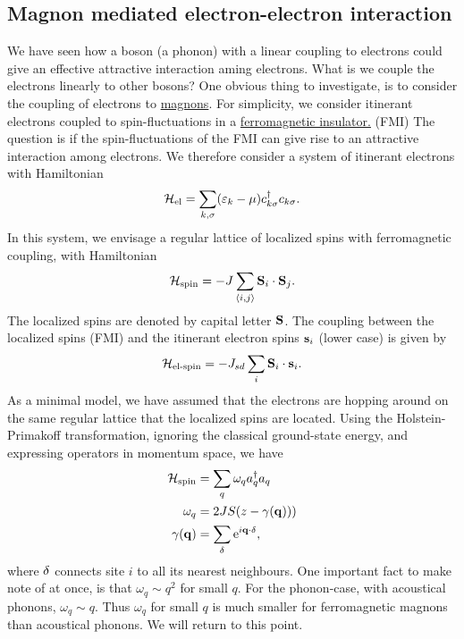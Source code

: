 \subsection[Magnons]{Magnon mediated electron-electron interaction}

We have seen how a boson (a phonon) with a linear coupling to electrons could give an effective attractive interaction aming electrons. 
What is we couple the electrons linearly to other bosons? One obvious thing to investigate, is to consider the coupling of electrons to \underline{magnons}.
For simplicity, we consider itinerant electrons coupled to spin-fluctuations in a \underline{ferromagnetic insulator.} (FMI) The question is if the spin-fluctuations of the FMI can give rise to an attractive interaction among electrons.
We therefore consider a system of itinerant electrons with Hamiltonian 
\begin{equation}
	\mathcal{H}_{\text{el}} = \sum_{k, \sigma}(\varepsilon_{k}-\mu)c_{k\sigma}^\dagger c_{k\sigma}.
\end{equation}
In this system, we envisage a regular lattice of localized spins with ferromagnetic coupling, with Hamiltonian
\begin{equation}
	\mathcal{H}_{\text{spin}} = -J\sum_{\langle i,j\rangle}\vb S_i\cdot\vb S_j.
	\end{equation}
The localized spins are denoted by capital letter $\vb S$.
The coupling between the localized spins (FMI) and the itinerant electron spins $\vb s_i$ (lower case) is given by 
\begin{equation}
	\mathcal{H}_{\text{el-spin}}  = -J_{sd}\sum_i\vb S_i\cdot \vb s_i.
\end{equation}
As a minimal model, we have assumed that the electrons are hopping around on the same regular lattice that the localized spins are located. 
Using the Holstein-Primakoff transformation, ignoring the classical ground-state energy, and expressing operators in momentum space, we have 
\begin{align}
	\mathcal{H}_{\text{spin}} &= \sum_q \omega_qa_q^\dagger a_q \\
	\omega_q &= 2JS(z- \gamma(\vb q))) \\
	\gamma(\vb q) &= \sum_\delta\mathrm{e}^{i\vb q\cdot \vb \delta},
\end{align}
where $\vb \delta$ connects site $i$ to all its nearest neighbours.
One important fact to make note of at once, is that $\omega_q \sim q^2$ for small $q$. For the phonon-case, with acoustical phonons, $\omega_q \sim q$. Thus $\omega_q$ for small $q$ is much smaller for ferromagnetic magnons than acoustical phonons. We will return to this point. 
